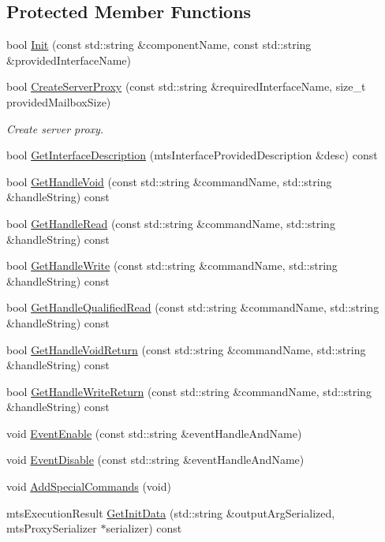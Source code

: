 \subsection*{Protected Member Functions}
\begin{DoxyCompactItemize}
\item 
bool \hyperlink{classmts_socket_proxy_server_a484df52523d8ba237358a6cc56b8d67a}{Init} (const std\+::string \&component\+Name, const std\+::string \&provided\+Interface\+Name)
\item 
bool \hyperlink{classmts_socket_proxy_server_a8040ee220cf3249685932aad1cf52231}{Create\+Server\+Proxy} (const std\+::string \&required\+Interface\+Name, size\+\_\+t provided\+Mailbox\+Size)
\begin{DoxyCompactList}\small\item\em Create server proxy. \end{DoxyCompactList}\item 
bool \hyperlink{classmts_socket_proxy_server_aac2d100483f25d78682b8137546a8c25}{Get\+Interface\+Description} (mts\+Interface\+Provided\+Description \&desc) const 
\item 
bool \hyperlink{classmts_socket_proxy_server_ab9a97e4761a5824bdb8cdd2b2f29b530}{Get\+Handle\+Void} (const std\+::string \&command\+Name, std\+::string \&handle\+String) const 
\item 
bool \hyperlink{classmts_socket_proxy_server_a33f70a2d493e886ecd92321928aeef9a}{Get\+Handle\+Read} (const std\+::string \&command\+Name, std\+::string \&handle\+String) const 
\item 
bool \hyperlink{classmts_socket_proxy_server_a44b7dcdd1649d6f8766fbc5eca76f07c}{Get\+Handle\+Write} (const std\+::string \&command\+Name, std\+::string \&handle\+String) const 
\item 
bool \hyperlink{classmts_socket_proxy_server_a9fc0e7143f33f086e8ed0e77946e294c}{Get\+Handle\+Qualified\+Read} (const std\+::string \&command\+Name, std\+::string \&handle\+String) const 
\item 
bool \hyperlink{classmts_socket_proxy_server_a432865d53e1346134ddcc41422b013f2}{Get\+Handle\+Void\+Return} (const std\+::string \&command\+Name, std\+::string \&handle\+String) const 
\item 
bool \hyperlink{classmts_socket_proxy_server_aa23bcc2804b23e7db80431e83caa3b3f}{Get\+Handle\+Write\+Return} (const std\+::string \&command\+Name, std\+::string \&handle\+String) const 
\item 
void \hyperlink{classmts_socket_proxy_server_a15fb0f2b7b457e74434f618f7b3c1b0d}{Event\+Enable} (const std\+::string \&event\+Handle\+And\+Name)
\item 
void \hyperlink{classmts_socket_proxy_server_a026fc4300e258e82f622f72fd7af1e6e}{Event\+Disable} (const std\+::string \&event\+Handle\+And\+Name)
\item 
void \hyperlink{classmts_socket_proxy_server_ae1e5bf81532c293525cadac52bc7d169}{Add\+Special\+Commands} (void)
\item 
mts\+Execution\+Result \hyperlink{classmts_socket_proxy_server_a08aa6a4f76551b78546ae525bde4f325}{Get\+Init\+Data} (std\+::string \&output\+Arg\+Serialized, mts\+Proxy\+Serializer $\ast$serializer) const 
\end{DoxyCompactItemize}
